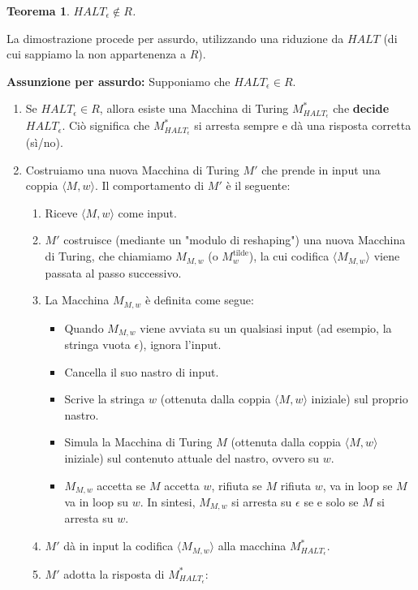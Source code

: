 \documentclass[a4paper]{article}
\makeatletter
\newtheorem{theorem}{Teorema}[section] %
\renewenvironment{proof}[1][\proofname]{\par
  \pushQED{\qed}%
  \normalfont \topsep6\p@\@plus6\p@\relax
  \trivlist
  \item[\hskip\labelsep
        \bfseries
    #1\@addpunct{.}]\ignorespaces
}{%
  \popQED\endtrivlist\@endpefalse
}
\makeatother
\begin{document}
\begin{theorem}
$HALT_\epsilon \notin R$.
\end{theorem}
\begin{proof}
La dimostrazione procede per assurdo, utilizzando una riduzione da $HALT$ (di cui sappiamo la non appartenenza a $R$).

\textbf{Assunzione per assurdo:} Supponiamo che $HALT_\epsilon \in R$.
\begin{enumerate}
    \item Se $HALT_\epsilon \in R$, allora esiste una Macchina di Turing $M_{HALT_\epsilon}^*$ che \textbf{decide} $HALT_\epsilon$. Ciò significa che $M_{HALT_\epsilon}^*$ si arresta sempre e dà una risposta corretta (sì/no).
    \item Costruiamo una nuova Macchina di Turing $M'$ che prende in input una coppia $\langle M, w \rangle$. Il comportamento di $M'$ è il seguente:
    \begin{enumerate}
        \item Riceve $\langle M, w \rangle$ come input.
        \item $M'$ costruisce (mediante un "modulo di reshaping") una nuova Macchina di Turing, che chiamiamo $M_{M,w}$ (o $M_w^{\text{tilde}}$), la cui codifica $\langle M_{M,w} \rangle$ viene passata al passo successivo.
        \item La Macchina $M_{M,w}$ è definita come segue:
        \begin{itemize}
            \item Quando $M_{M,w}$ viene avviata su un qualsiasi input (ad esempio, la stringa vuota $\epsilon$), ignora l'input.
            \item Cancella il suo nastro di input.
            \item Scrive la stringa $w$ (ottenuta dalla coppia $\langle M, w \rangle$ iniziale) sul proprio nastro.
            \item Simula la Macchina di Turing $M$ (ottenuta dalla coppia $\langle M, w \rangle$ iniziale) sul contenuto attuale del nastro, ovvero su $w$.
            \item $M_{M,w}$ accetta se $M$ accetta $w$, rifiuta se $M$ rifiuta $w$, va in loop se $M$ va in loop su $w$. In sintesi, $M_{M,w}$ si arresta su $\epsilon$ se e solo se $M$ si arresta su $w$.
        \end{itemize}
        \item $M'$ dà in input la codifica $\langle M_{M,w} \rangle$ alla macchina $M_{HALT_\epsilon}^*$.
        \item $M'$ adotta la risposta di $M_{HALT_\epsilon}^*$:

\end{enumerate}
\end{enumerate}
\end{proof}
\end{document}

